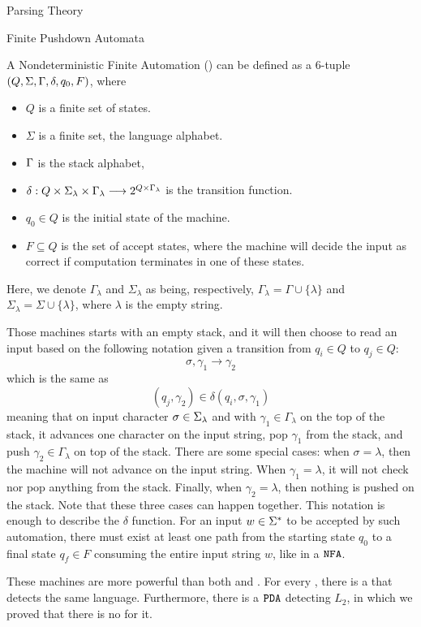 \begin{section}{Parsing Theory}
\begin{subsection}{Finite Pushdown Automata}
\begin{definition}
A Nondeterministic Finite Automation () can be defined as a 6-tuple
$(Q, \Sigma, \Gamma, \delta, q_0, F)$, where
\begin{itemize}

\item $Q$ is a finite set of states.
\item $\Sigma$ is a finite set, the language alphabet.
\item $\Gamma$ is the stack alphabet,
\item $\delta:Q\times\Sigma_\lambda \times \Gamma_\lambda \longrightarrow 2^{Q \times \Gamma_\lambda}$ is the transition function.
\item $q_0 \in Q$ is the initial state of the machine.
\item $F \subseteq Q$ is the set of accept states, where the machine will
decide the input as correct if computation terminates in one of these
states.
\end{itemize}
\end{definition}
Here, we denote $\Gamma_\lambda$ and $\Sigma_\lambda$ as being, respectively,
$\Gamma_\lambda = \Gamma \cup \{\lambda\}$ and $\Sigma_\lambda = \Sigma \cup \{\lambda\}$, where $\lambda$ is
the empty string.

Those machines starts with an empty stack, and it will then choose
to read an input based on the following notation given a transition from $q_i \in Q$
to $q_j \in Q$:
$$\sigma, \gamma_1 \rightarrow \gamma_2$$
which is the same as
$$(q_j, \gamma_2) \in \delta(q_i, \sigma, \gamma_1)$$
meaning that on input character $\sigma \in \Sigma_\lambda$ and with $\gamma_1 \in
\Gamma_\lambda$ on the top of the stack, it advances one character on the input
string, pop $\gamma_1$ from the stack, and push $\gamma_2 \in \Gamma_\lambda$
on top of the stack. There are some special cases: when $\sigma = \lambda$,
then the machine will not advance on the input string. When $\gamma_1 =
\lambda$, it will not check nor pop anything from the stack. Finally, when
$\gamma_2 = \lambda$, then nothing is pushed on the stack. Note that these
three cases can happen together. This notation is enough to describe the
$\delta$ function.  For an input $w \in \Sigma^*$ to be accepted by such
automation, there must exist at least one path from the starting state $q_0$ to
a final state $q_f \in F$ consuming the entire input string $w$, like in
a $\texttt{NFA}$.

These machines are more powerful than both  and .
For every , there is a  that detects the same language.
Furthermore, there is a $\texttt{PDA}$ detecting $L_2$, in
which we proved that there is no  for it.


\end{subsection}
\end{section}
